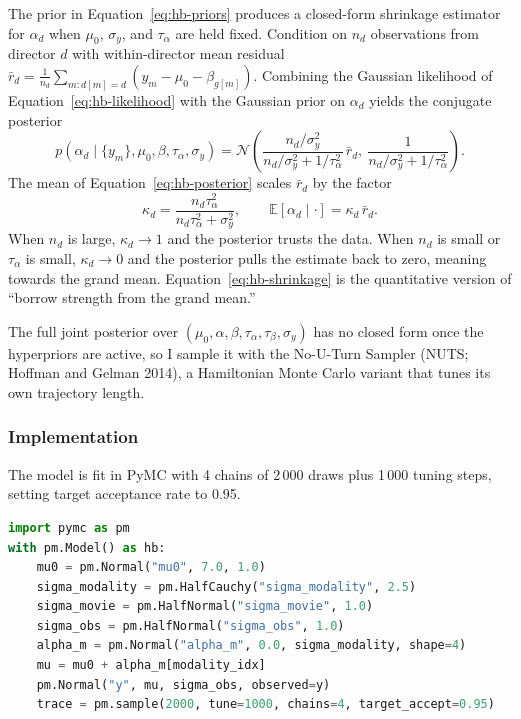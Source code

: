 \documentclass{article}
\begin{document}
The prior in Equation~\ref{eq:hb-priors} produces a closed-form shrinkage estimator for $\alpha_d$ when $\mu_0$, $\sigma_y$, and $\tau_\alpha$ are held fixed. Condition on $n_d$ observations from director $d$ with within-director mean residual $\bar r_d = \frac{1}{n_d}\sum_{m: d[m] = d}(y_m - \mu_0 - \beta_{g[m]})$. Combining the Gaussian likelihood of Equation~\ref{eq:hb-likelihood} with the Gaussian prior on $\alpha_d$ yields the conjugate posterior
\begin{equation}
p(\alpha_d \mid \{y_m\}, \mu_0, \beta, \tau_\alpha, \sigma_y) = \mathcal{N}\!\left(\frac{n_d / \sigma_y^2}{n_d / \sigma_y^2 + 1 / \tau_\alpha^2}\,\bar r_d,\ \frac{1}{n_d / \sigma_y^2 + 1 / \tau_\alpha^2}\right).
\label{eq:hb-posterior}
\end{equation}
The mean of Equation~\ref{eq:hb-posterior} scales $\bar r_d$ by the factor
\begin{equation}
\kappa_d = \frac{n_d \tau_\alpha^2}{n_d \tau_\alpha^2 + \sigma_y^2}, \qquad \mathbb{E}[\alpha_d \mid \cdot] = \kappa_d\, \bar r_d.
\label{eq:hb-shrinkage}
\end{equation}
When $n_d$ is large, $\kappa_d \to 1$ and the posterior trusts the data. When $n_d$ is small or $\tau_\alpha$ is small, $\kappa_d \to 0$ and the posterior pulls the estimate back to zero, meaning towards the grand mean. Equation~\ref{eq:hb-shrinkage} is the quantitative version of ``borrow strength from the grand mean.''

The full joint posterior over $(\mu_0, \alpha, \beta, \tau_\alpha, \tau_\beta, \sigma_y)$ has no closed form once the hyperpriors are active, so I sample it with the No-U-Turn Sampler (NUTS; Hoffman and Gelman 2014), a Hamiltonian Monte Carlo variant that tunes its own trajectory length.

\subsubsection*{Implementation}

The model is fit in PyMC with 4 chains of 2\,000 draws plus 1\,000 tuning steps, setting target acceptance rate to 0.95.

\begin{lstlisting}[language=Python]
import pymc as pm
with pm.Model() as hb:
    mu0 = pm.Normal("mu0", 7.0, 1.0)
    sigma_modality = pm.HalfCauchy("sigma_modality", 2.5)
    sigma_movie = pm.HalfNormal("sigma_movie", 1.0)
    sigma_obs = pm.HalfNormal("sigma_obs", 1.0)
    alpha_m = pm.Normal("alpha_m", 0.0, sigma_modality, shape=4)
    mu = mu0 + alpha_m[modality_idx]
    pm.Normal("y", mu, sigma_obs, observed=y)
    trace = pm.sample(2000, tune=1000, chains=4, target_accept=0.95)
\end{lstlisting}
\end{document}
